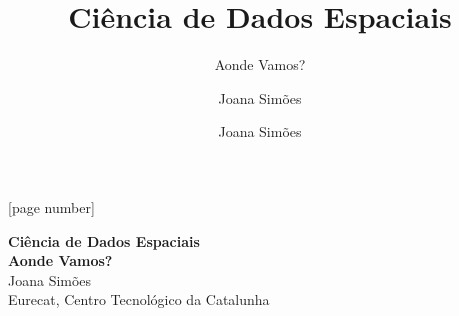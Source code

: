 \documentclass[hyperref={pdfpagelabels=true}]{beamer}
\title{Ci\^{e}ncia de Dados Espaciais}
\subtitle{Aonde Vamos?}
\author{Joana Sim\~{o}es}
\author[shortname]{Joana Sim\~{o}es \inst{1}}
\institute[shortinst]{\inst{1} Eurecat, Centro Tecnol\'{o}gico da Catalunha}
\begin{document}
[page number]


{  
\begin{frame}[plain]
    \vspace{10em}
    \begin{titleBox}
        \centering \textbf{Ci\^{e}ncia de Dados Espaciais}\\
        \textbf{Aonde Vamos?}\\  
        \justify
        \small{Joana Sim\~{o}es}\\
        \small{Eurecat, Centro Tecnol\'{o}gico da Catalunha\\
        }
        
    \end{titleBox}

\end{frame} 
} 
 

\end{document}
